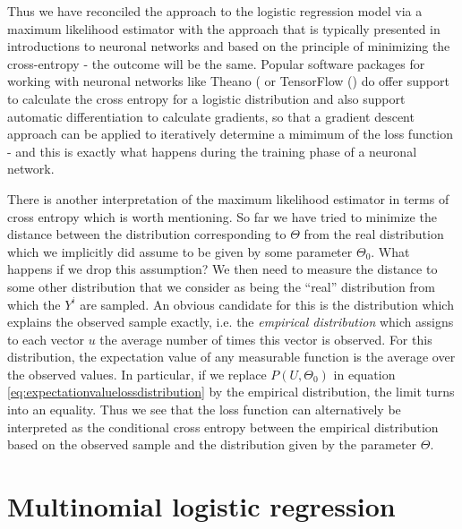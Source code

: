 \documentclass[a4paper, draft]{report}
\numberwithin{section}{chapter}
\numberwithin{equation}{chapter}
\theoremstyle{own}
\theoremstyle{remark}
\begin{document}
Thus we have reconciled the approach to the logistic regression model via a maximum likelihood estimator with the approach that is typically presented in introductions to neuronal networks and based on the principle of minimizing the cross-entropy - the outcome will be the same. Popular software packages for working with neuronal networks like Theano (\cite{Theano} or TensorFlow (\cite{Tensorflow}) do offer support to calculate the cross entropy for a logistic distribution and also support automatic differentiation to calculate gradients, so that a gradient descent approach can be applied to iteratively determine a mimimum of the loss function - and this is exactly what happens during the training phase of a neuronal network.

There is another interpretation of the maximum likelihood estimator in terms of cross entropy which is worth mentioning. So far we have tried to minimize the distance between the distribution corresponding to $\Theta$ from the real distribution which we implicitly did assume to be given by some parameter $\Theta_0$. What happens if we drop this assumption? We then need to measure the distance to some other distribution that we consider as being the ``real'' distribution from which the $Y^i$ are sampled. An obvious candidate for this is the distribution which explains the observed sample exactly, i.e. the {\em empirical distribution} which assigns to each vector $u$ the average number of times this vector is observed. For this distribution, the expectation value of any measurable function is the average over the observed values. In particular, if we replace $P(U,\Theta_0)$ in equation \eqref{eq:expectationvaluelossdistribution} by the empirical distribution, the limit turns into an equality. Thus we see that the loss function can alternatively be interpreted as the conditional cross entropy between the empirical distribution based on the observed sample and the distribution given by the parameter $\Theta$. 

\chapter{Multinomial logistic regression}
\end{document}
